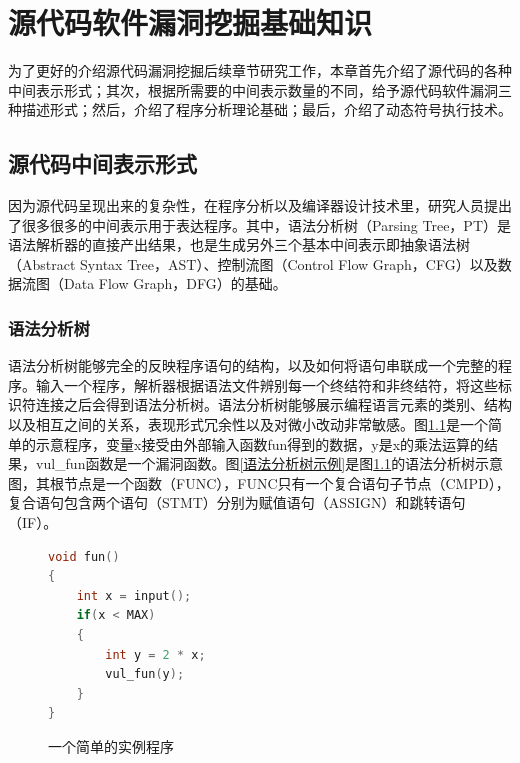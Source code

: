 \chapter{源代码软件漏洞挖掘基础知识}

为了更好的介绍源代码漏洞挖掘后续章节研究工作，本章首先介绍了源代码的各种中间表示形式；其次，根据所需要的中间表示数量的不同，给予源代码软件漏洞三种描述形式；然后，介绍了程序分析理论基础；最后，介绍了动态符号执行技术。

%

\section{源代码中间表示形式}

因为源代码呈现出来的复杂性，在程序分析以及编译器设计技术里，研究人员提出了很多很多的中间表示用于表达程序。其中，语法分析树（Parsing Tree，PT）是语法解析器的直接产出结果，也是生成另外三个基本中间表示即抽象语法树（Abstract Syntax Tree，AST）、控制流图（Control Flow Graph，CFG）以及数据流图（Data Flow Graph，DFG）的基础。

\subsection{语法分析树}

语法分析树能够完全的反映程序语句的结构，以及如何将语句串联成一个完整的程序。输入一个程序，解析器根据语法文件辨别每一个终结符和非终结符，将这些标识符连接之后会得到语法分析树。语法分析树能够展示编程语言元素的类别、结构以及相互之间的关系，表现形式冗余性以及对微小改动非常敏感。图\ref{一个简单的实例程序}是一个简单的示意程序，变量x接受由外部输入函数fun得到的数据，y是x的乘法运算的结果，vul\_fun函数是一个漏洞函数。图\ref{语法分析树示例}是图\ref{一个简单的实例程序}的语法分析树示意图，其根节点是一个函数{（FUNC）}，FUNC只有一个复合语句子节点{（CMPD）}，复合语句包含两个语句{（STMT）}分别为赋值语句{（ASSIGN）}和跳转语句{（IF）}。


\begin{figure}[h]
\begin{lstlisting}[language=C]
void fun()
{
	int x = input();
	if(x < MAX)
	{
		int y = 2 * x;
		vul_fun(y);
	}
}
\end{lstlisting}
\caption{一个简单的实例程序}
\label{一个简单的实例程序}
\end{figure}


